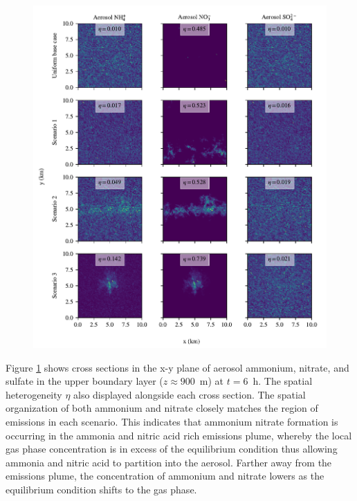 \documentclass[journal abbreviation, manuscript]{copernicus}
\begin{document}
\begin{figure}[!h]
	\centering
	\includegraphics[]{figures/aerosol-SNA-spatial-heterogeneity-time36-z45.pdf}
	\caption{}
	\label{fig:aero-cross-sec}
\end{figure} 

Figure \ref{fig:aero-cross-sec} shows cross sections in the x-y plane of aerosol ammonium, nitrate, and sulfate in the upper boundary layer ($z\approx900$~m) at $t=6$~h. The spatial heterogeneity $\eta$ also displayed alongside each cross section. The spatial organization of both ammonium and nitrate closely matches the region of emissions in each scenario. This indicates that ammonium nitrate formation is occurring in the ammonia and nitric acid rich emissions plume, whereby the local gas phase concentration is in excess of the equilibrium condition thus allowing ammonia and nitric acid to partition into the aerosol. Farther away from the emissions plume, the concentration of ammonium and nitrate lowers as the equilibrium condition shifts to the gas phase. 
\end{document}
